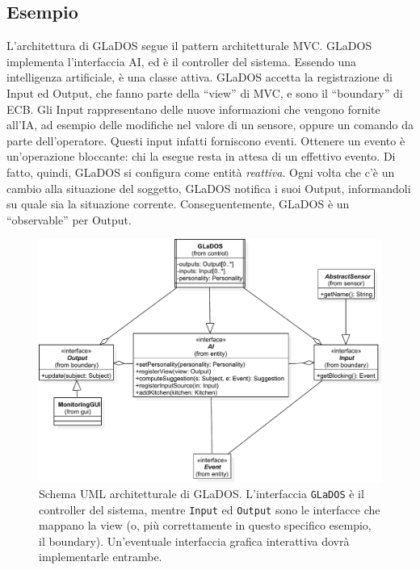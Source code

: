 \documentclass[a4paper,12pt]{report}
\begin{document}
\subsection*{Esempio}

L'architettura di GLaDOS segue il pattern architetturale MVC.
%
GLaDOS implementa l'interfaccia AI, ed è il controller del sistema.
Essendo una intelligenza artificiale, è una classe attiva.
%
GLaDOS accetta la registrazione di Input ed Output, che fanno parte della ``view'' di MVC, e sono il ``boundary'' di ECB.
Gli Input rappresentano delle nuove informazioni che vengono fornite all'IA, ad esempio delle modifiche nel valore di un sensore, oppure un comando da parte dell'operatore.
Questi input infatti forniscono eventi.
Ottenere un evento è un'operazione bloccante: chi la esegue resta in attesa di un effettivo evento.
Di fatto, quindi, GLaDOS si configura come entità \textit{reattiva}.
Ogni volta che c'è un cambio alla situazione del soggetto, GLaDOS notifica i suoi Output,
informandoli su quale sia la situazione corrente.
%
Conseguentemente, GLaDOS è un ``observable'' per Output.

\begin{figure}[h]
	\centering{}
	\includegraphics[width=\textwidth,scale=0.5]{img/arch}
	\caption{Schema UML architetturale di GLaDOS. L'interfaccia \texttt{GLaDOS} è il controller del sistema, mentre \texttt{Input} ed \texttt{Output} sono le interfacce che mappano la view (o, più correttamente in questo specifico esempio, il boundary). Un'eventuale interfaccia grafica interattiva dovrà implementarle entrambe.}
	\label{img:goodarch}
\end{figure}
\end{document}
